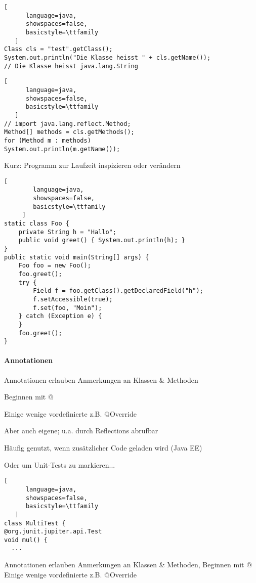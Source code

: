 \documentclass[10pt]{article}
\begin{document}
\begin{lstlisting}[
      language=java,
      showspaces=false,
      basicstyle=\ttfamily
   ]
Class cls = "test".getClass();
System.out.println("Die Klasse heisst " + cls.getName());
// Die Klasse heisst java.lang.String
\end{lstlisting}

\begin{lstlisting}[
      language=java,
      showspaces=false,
      basicstyle=\ttfamily
   ]
// import java.lang.reflect.Method;
Method[] methods = cls.getMethods();
for (Method m : methods)
System.out.println(m.getName());
\end{lstlisting}

Kurz: Programm zur Laufzeit inspizieren oder verändern

\begin{lstlisting}[
        language=java,
        showspaces=false,
        basicstyle=\ttfamily
     ]
static class Foo {
    private String h = "Hallo";
    public void greet() { System.out.println(h); }
}
public static void main(String[] args) {
    Foo foo = new Foo();
    foo.greet();
    try {
        Field f = foo.getClass().getDeclaredField("h");
        f.setAccessible(true);
        f.set(foo, "Moin");
    } catch (Exception e) {
    }
    foo.greet();
}
\end{lstlisting}


\paragraph{Annotationen}
\begin{itemize*}
  \item Annotationen erlauben Anmerkungen an Klassen \& Methoden
  \item Beginnen mit @
  \item Einige wenige vordefinierte z.B. @Override
  \item Aber auch eigene; u.a. durch Reflections abrufbar
  \item Häufig genutzt, wenn zusätzlicher Code geladen wird (Java EE)
  \item Oder um Unit-Tests zu markieren...
\end{itemize*}

\begin{lstlisting}[
      language=java,
      showspaces=false,
      basicstyle=\ttfamily
   ]
class MultiTest {
@org.junit.jupiter.api.Test
void mul() {
  ...
\end{lstlisting}
Annotationen erlauben Anmerkungen an Klassen \& Methoden, Beginnen mit @
Einige wenige vordefinierte z.B. @Override
\end{document}
